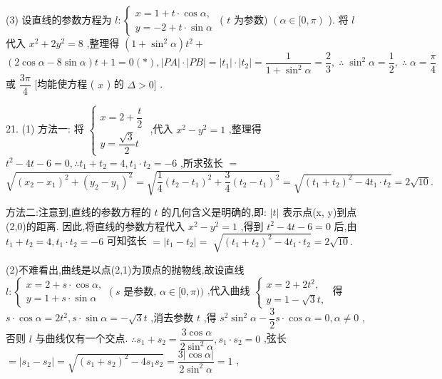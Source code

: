 (3) 设直线的参数方程为 $l : \left\{  \begin{array}{l} x = 1 + t \cdot  \cos \alpha , \\  y =  - 2 + t \cdot  \sin \alpha  \end{array}\right.$ ( $t$ 为参数) $\left( {\alpha  \in  \lbrack 0,\pi }\right)$ ). 将 $l$ 代入 ${x}^{2} + 2{y}^{2} = 8$ ,整理得 $\left( {1 + {\sin }^{2}\alpha }\right) {t}^{2} +$  $\left( {2\cos \alpha  - 8\sin \alpha }\right) t + 1 = 0\left( *\right) ,\left| {PA}\right|  \cdot  \left| {PB}\right|  = \left| {t}_{1}\right|  \cdot  \left| {t}_{2}\right|  = \dfrac{1}{1 + {\sin }^{2}\alpha } = \dfrac{2}{3},\;\therefore \;{\sin }^{2}\alpha  = \dfrac{1}{2},\;\therefore \;\alpha  = \dfrac{\pi }{4}$ 或 $\dfrac{3\pi }{4}$ [均能使方程 ( $x$ ) 的 $\Delta  > 0\rbrack$ .

21. (1) 方法一: 将 $\left\{  \begin{array}{l} x = 2 + \dfrac{t}{2} \\  y = \dfrac{\sqrt{3}}{2}t \end{array}\right.$ ,代入 ${x}^{2} - {y}^{2} = 1$ ,整理得 ${t}^{2} - {4t} - 6 = 0,\therefore {t}_{1} + {t}_{2} = 4,{t}_{1} \cdot  {t}_{2} =  - 6$ ,所求弦长 $=$  $\sqrt{{\left( {x}_{2} - {x}_{1}\right) }^{2} + {\left( {y}_{2} - {y}_{1}\right) }^{2}} = \sqrt{\dfrac{1}{4}{\left( {t}_{2} - {t}_{1}\right) }^{2} + \dfrac{3}{4}{\left( {t}_{2} - {t}_{1}\right) }^{2}} = \sqrt{{\left( {t}_{1} + {t}_{2}\right) }^{2} - 4{t}_{1} \cdot  {t}_{2}} = 2\sqrt{10}.$

方法二:注意到,直线的参数方程的 $t$ 的几何含义是明确的,即: $\left| t\right|$ 表示点(x, y)到点(2,0)的距离. 因此,将直线的参数方程代入 ${x}^{2} - {y}^{2} = 1$ ,得到 ${t}^{2} - {4t} - 6 = 0$ 后,由 ${t}_{1} + {t}_{2} = 4,{t}_{1} \cdot  {t}_{2} =  - 6$ 可知弦长 $= \left| {{t}_{1} - {t}_{2}}\right|  =$  $\sqrt{{\left( {t}_{1} + {t}_{2}\right) }^{2} - 4{t}_{1} \cdot  {t}_{2}} = 2\sqrt{10}.$

(2)不难看出,曲线是以点(2,1)为顶点的抛物线,故设直线 $l : \left\{  {\begin{array}{l} x = 2 + s \cdot  \cos \alpha , \\  y = 1 + s \cdot  \sin \alpha  \end{array}\left( {s\text{ 是参数, }\alpha  \in  \lbrack 0,\pi ))}\right. }\right.$ ,代入曲线 $\left\{  \begin{array}{l} x = 2 + 2{t}^{2}, \\  y = 1 - \sqrt{3}t, \end{array}\right.$ 得 $s \cdot  \cos \alpha  = 2{t}^{2},s \cdot  \sin \alpha  =  - \sqrt{3}t$ ,消去参数 $t$ ,得 ${s}^{2}{\sin }^{2}\alpha  - \dfrac{3}{2}s \cdot  \cos \alpha  = 0,\alpha  \neq  0$ ,否则 $l$ 与曲线仅有一个交点. $\therefore {s}_{1} + {s}_{2} = \dfrac{3\cos \alpha }{2{\sin }^{2}\alpha },{s}_{1} \cdot  {s}_{2} = 0$ ,弦长 $= \left| {{s}_{1} - {s}_{2}}\right|  = \sqrt{{\left( {s}_{1} + {s}_{2}\right) }^{2} - 4{s}_{1}{s}_{2}} = \dfrac{3\left| {\cos \alpha }\right| }{2{\sin }^{2}\alpha } = 1$ ,

